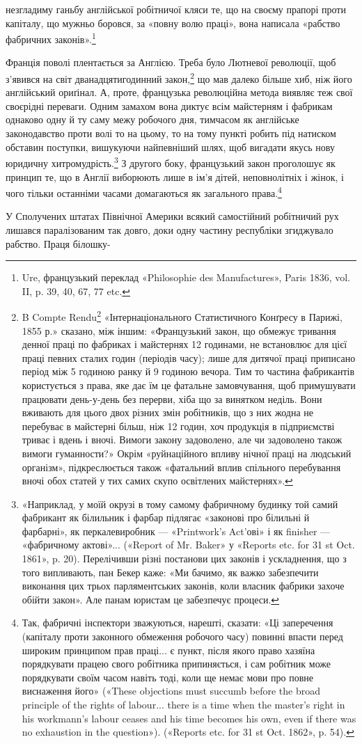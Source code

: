 незгладиму ганьбу англійської робітничої кляси те, що на своєму
прапорі проти капіталу, що мужньо боровся, за «повну волю
праці», вона написала «рабство фабричних законів».\footnote{
Ure, французький переклад «Philosophie des Manufactures», Paris
1836, vol. II, p. 39, 40, 67, 77 etc.
}

Франція поволі плентається за Англією. Треба було Лютневої
революції, щоб з’явився на світ дванадцятигодинний закон,\footnote{
B Compte Rendu\footnote*{
— звіті. \emph{Ред.}
} «Інтернаціонального Статистичного Конґресу
в Парижі, 1855 р.» сказано, між іншим: «Французький закон,
що обмежує тривання денної праці по фабриках і майстернях 12 годинами,
не встановлює для цієї праці певних сталих годин (періодів часу); лише
для дитячої праці приписано період між 5 годиною ранку й 9 годиною вечора.
Тим то частина фабрикантів користується з права, яке дає їм
це фатальне замовчування, щоб примушувати працювати день-у-день
без перерви, хіба що за винятком неділь. Вони вживають для цього двох
різних змін робітників, що з них жодна не перебуває в майстерні більш,
ніж 12 годин, хоч продукція в підприємстві триває і вдень і вночі. Вимоги
закону задоволено, але чи задоволено також вимоги гуманности?» Окрім
«руйнаційного впливу нічної праці на людський організм», підкреслюється
також «фатальний вплив спільного перебування вночі обох статей
у тих самих скупо освітлених майстернях».
}
що мав далеко більше хиб, ніж його англійський ориґінал. А, проте,
французька революційна метода виявляє теж свої своєрідні
переваги. Одним замахом вона диктує всім майстерням і фабрикам
однаково одну й ту саму межу робочого дня, тимчасом як
англійське законодавство проти волі то на цьому, то на тому
пункті робить під натиском обставин поступки, вишукуючи найпевніший
шлях, щоб вигадати якусь нову юридичну хитромудрість.\footnote{
«Наприклад, у моїй окрузі в тому самому фабричному будинку
той самий фабрикант як білильник і фарбар підлягає «законові про білильні
й фарбарні», як перкалевиробник — «Printwork’s Act’ові» і як finisher —
«фабричному актові»... («Report of Mr. Baker» у «Reports etc. for 31 st
Oct. 1861», p. 20). Перелічивши різні постанови цих законів і ускладнення,
що з того випливають, пан Бекер каже: «Ми бачимо, як важко забезпечити
виконання цих трьох парляментських законів, коли власник фабрики
захоче обійти закон». Але панам юристам це забезпечує процеси.
}
З другого боку, французький закон проголошує як
принцип те, що в Англії виборюють лише в ім’я дітей, неповнолітніх
і жінок, і чого тільки останніми часами домагаються як
загального права.\footnote{
Так, фабричні інспектори зважуються, нарешті, сказати: «Ці
заперечення (капіталу проти законного обмеження робочого часу) повинні
впасти перед широким принципом прав праці... є пункт, після якого право
хазяїна порядкувати працею свого робітника припиняється, і сам робітник
може порядкувати своїм часом навіть тоді, коли ще немає мови про повне
виснаження його» («These objections must succumb before the broad
principle of the rights of labour... there is a time when the master’s right
in his workmann’s labour ceases and his time becomes his own, even if
there was no exhaustion in the question»). («Reports etc. for 31 st Oct.
1862», p. 54).
}

У Сполучених штатах Північної Америки всякий самостійний
робітничий рух лишався паралізованим так довго, доки
одну частину республіки згиджувало рабство. Праця білошку-